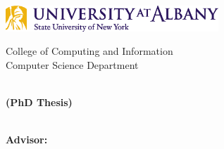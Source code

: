 \noindent
\begin{minipage}{3.2in}
    \includegraphics[width=3.15in]{images/logo_A2_pms124_269.eps}
\end{minipage}
\hspace{\fill}
\begin{minipage}{2.3in}
    \setlength{\baselineskip}{13pt}
    \makebox{\ } \hfill {\footnotesize College of Computing and Information} \\
    \makebox{\ } \hfill {\footnotesize Computer Science Department}
\end{minipage}

\vspace*{2in}
\begin{center}
    \begin{minipage}{0.75\textwidth}
        \centering
        \begin{spacing}{2}
            \bfseries
            {\huge\thetitle} \\[+1ex]
            (PhD Thesis)
        \end{spacing}
    \end{minipage}
\end{center}

\vspace*{1.5in}
\begin{center}
    \begin{spacing}{1.5}
        \bfseries\large \theauthor \\
        Advisor: \theadvisor \\
        \thedate
    \end{spacing}
\end{center}

